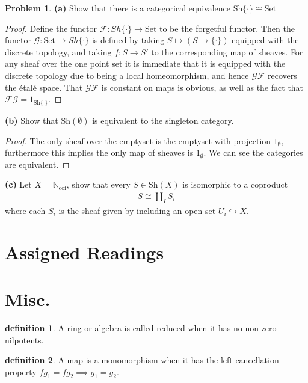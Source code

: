 \documentclass[10.5pt]{article}
\theoremstyle{definition}
\newtheorem{pb}{Problem}
\newtheorem{definition}{definition}
\newcommand{\set}[1]{\{#1\}}
\begin{document}
    \begin{pb}
        \textbf{(a)} Show that there is a categorical equivalence \(\text{Sh}\set{\cdot} \cong \text{Set}\)
        \begin{proof}
            Define the functor \(\mathcal{F}: {Sh}\set{\cdot} \to \text{Set}\) to be the forgetful functor. Then the functor \(\mathcal{G}: \text{Set} \to {Sh}\set{\cdot}\) is defined by taking \(S \mapsto (S \to \set{\cdot})\) equipped with the discrete topology, and taking \(f: S \to S'\) to the corresponding map of sheaves. For any sheaf over the one point set it is immediate that it is equipped with the discrete topology due to being a local homeomorphism, and hence \(\mathcal{G} \mathcal{F}\) recovers the \'etal\'e space. That \(\mathcal{G} \mathcal{F}\) is constant on maps is obvious, as well as the fact that \(\mathcal{F}\mathcal{G} = 1_{\text{Sh}\set{\cdot}}\).
        \end{proof}

        \textbf{(b)} Show that \(\text{Sh}(\emptyset)\) is equivalent to the singleton category.
        \begin{proof}
            The only sheaf over the emptyset is the emptyset with projection \(1_\emptyset\), furthermore this implies the only map of sheaves is \(1_\emptyset\). We can see the categories are equivalent.
        \end{proof}

        \textbf{(c)} Let \(X = \mathbb{N}_{\text{cof}}\), show that every \(S \in \text{Sh}(X)\) is isomorphic to a coproduct
        \begin{align*}
            S \cong \coprod_I S_i
        \end{align*}
        where each \(S_i\) is the sheaf given by including an open set \(U_i \hookrightarrow X\).
    \end{pb}
    
    \section{Assigned Readings}

    \section{Misc.}
    \begin{definition}
        A ring or algebra is called reduced when it has no non-zero nilpotents.
    \end{definition}
    \begin{definition}
        A map is a monomorphism when it has the left cancellation property \(fg_1 = fg_2 \implies g_1 = g_2\).
    \end{definition}
\end{document}
